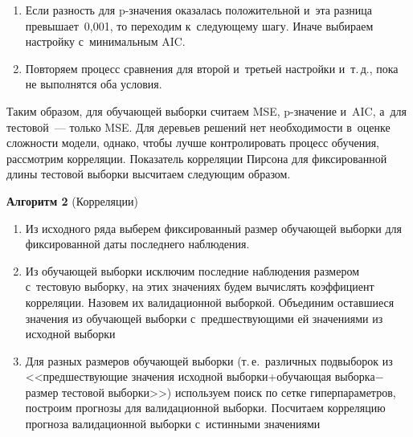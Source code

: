 \begin{multicols}{2}
\begin{enumerate}[1.]
        Посчитаем разность между показателями \mbox{p-зна}\-че\-ния для первой настройки и~второй настройки, 
        аналогично посчитаем разность для критерия AIC.
        
        
        \item
        Если разность для p-зна\-че\-ния оказалась положительной и~эта разница превышает~0,001, 
        то переходим к~сле\-ду\-юще\-му шагу. Иначе выбираем настройку с~минимальным AIC.
        
        \item
        
        Повторяем процесс сравнения для второй и~трет\-ьей настройки и~т.\,д., пока не выполнятся оба условия.
        \end{enumerate}

\noindent
Таким образом, для обучающей выборки считаем MSE, p-зна\-че\-ние и~AIC, а~для тестовой~--- только MSE.
Для деревьев решений нет необходимости в~оценке сложности модели, однако, чтобы 
лучше контролировать процесс обучения, рассмотрим корреляции. Показатель корреляции 
Пирсона для фиксированной длины тестовой выборки высчитаем сле\-ду\-ющим образом.

\vspace*{2pt}

\textbf{Алгоритм 2} (Корреляции) %
    
        \noindent
        \begin{enumerate}[1.]
        
        \item
        Из исходного ряда выберем фиксированный размер обучающей выборки для 
        фиксированной даты последнего наблюдения.

        
        \item
        Из обучающей выборки исключим последние наблюдения размером с~тестовую выборку, 
        на этих значениях будем вычислять коэффициент корреляции. Назовем их валидационной 
        выборкой. Объединим оставшиеся значения из обучающей выборки с~предшествующими ей 
        значениями из исходной выборки
        
        \item
        Для разных размеров обучающей выборки (т.\,е.\ различных подвыборок из <<пред\-шест\-ву\-ющие 
        значения исходной вы\-бор\-ки\;+\;обуча\-ющая вы\-бор\-ка\;$-$\;раз\-мер тес\-то\-вой выборки>>) 
        используем поиск по сетке гиперпараметров, построим прогнозы для валидационной выборки. 
        Посчитаем корреляцию прогноза валидационной выборки с~истинными значениями
        

\end{enumerate}
\end{multicols}
